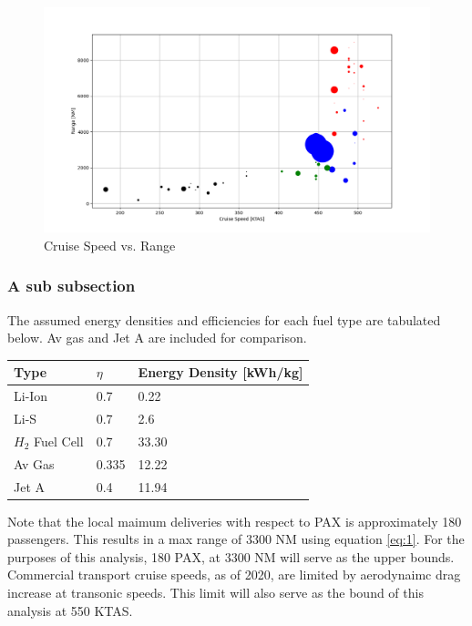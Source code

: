 \documentclass[12pt]{article} %
\begin{document}
\begin{figure}[h]
\begin{center}
\includegraphics[width=1\textwidth]{speed_v_range}
\end{center}
\caption{Cruise Speed vs. Range}
\end{figure}

\subsubsection{A sub subsection}

The assumed energy densities and efficiencies for each fuel type are tabulated below. Av gas and Jet A are included for comparison.

\begin{center}
\begin{tabular}{ | m{3cm} | m{3cm}| m{3cm} | } 
\hline
Type& $\eta$ & Energy Density [kWh/kg]\\ 
\hline
Li-Ion& 0.7 & 0.22 \\ 
\hline
Li-S& 0.7 & 2.6 \\ 
\hline
$H_{2}$ Fuel Cell & 0.7 & 33.30 \\ 
\hline
Av Gas & 0.335 & 12.22 \\ 
\hline
Jet A & 0.4 & 11.94 \\ 
\hline
\end{tabular}
\end{center}

Note that the local maimum deliveries with respect to PAX is approximately 180 passengers. This results in a max range of 3300 NM using equation \ref{eq:1}. For the purposes of this analysis, 180 PAX, at 3300 NM will serve as the upper bounds. Commercial transport cruise speeds, as of 2020, are limited by aerodynaimc drag increase at transonic speeds. This limit will also serve as the bound of this analysis at 550 KTAS.
\end{document}
